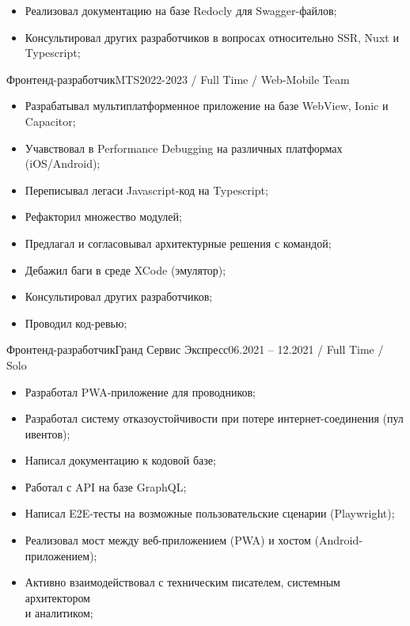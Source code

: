 \documentclass[a4paper,12pt]{article}
\begin{document}
\begin{minipage}[t]{1\textwidth}
    \begin{itemize}[leftmargin=*]
      \item Реализовал документацию на базе Redocly для Swagger-файлов;
      \item Консультировал других разработчиков в вопросах относительно SSR, Nuxt и Typescript;
        \end{itemize}

\vspace*{0.8em}

\begin{ExperienceBlock}{Фронтенд-разработчик}{MTS}{2022-2023 / Full Time / Web-Mobile Team}
    \begin{itemize}[leftmargin=*]
      \item Разрабатывал мультиплатформенное приложение на базе WebView, Ionic и Capacitor;
     \item Учавствовал в Performance Debugging на различных платформах (iOS/Android);
    \item Переписывал легаси Javascript-код на Typescript;
    \item Рефакторил множество модулей;
    \item Предлагал и согласовывал архитектурные решения с командой;
    \item Дебажил баги в среде XCode (эмулятор);
    \item Консультировал других разработчиков;
    \item Проводил код-ревью;
    \end{itemize}
\end{ExperienceBlock}




\begin{ExperienceBlock}{Фронтенд-разработчик}{Гранд Сервис Экспресс}{06.2021 -- 12.2021 / Full Time / Solo}
  \begin{itemize}[leftmargin=*]
    \item Разработал PWA-приложение для проводников;
    \item Разработал систему отказоустойчивости при потере интернет-соединения (пул ивентов);
    \item Написал документацию к кодовой базе;
    \item Работал с API на базе GraphQL;
    \item Написал E2E-тесты на возможные пользовательские сценарии (Playwright);
    \item Реализовал мост между веб-приложением (PWA) и хостом (Android-приложением);
    \item Активно взаимодействовал с техническим писателем, системным архитектором \\ и аналитиком;
  \end{itemize}
\end{ExperienceBlock}


\end{minipage}
\end{document}
